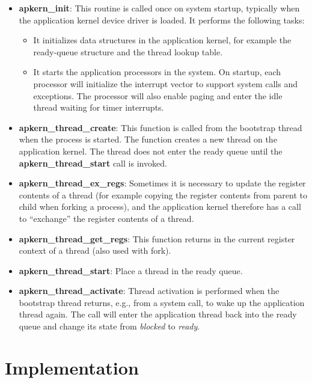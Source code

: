 \begin{itemize}
\item \textbf{apkern\_init}: This routine is called once on system startup,
  typically when the application kernel device driver is loaded. It performs
  the following tasks:
  \begin{itemize}
  \item It initializes data structures in the application kernel, for example the
    ready-queue structure and the thread lookup table.
  \item It starts the application processors in the system. On startup, each
    processor will initialize the interrupt vector to support system calls and
    exceptions. The processor will also enable paging and enter the idle
    thread waiting for timer interrupts.
  \end{itemize}
\item \textbf{apkern\_thread\_create}: This function is called from the
  bootstrap thread when the process is started. The function creates a new
  thread on the application kernel. The thread does not enter the ready queue
  until the \textbf{apkern\_thread\_start} call is invoked.

\item \textbf{apkern\_thread\_ex\_regs}: Sometimes it is necessary to update
  the register contents of a thread (for example copying the register contents
  from parent to child when forking a process), and the application kernel
  therefore has a call to ``exchange'' the register contents of a thread.

\item \textbf{apkern\_thread\_get\_regs}: This function returns in the current
  register context of a thread (also used with fork).

\item \textbf{apkern\_thread\_start}: Place a thread in the ready queue.

\item \textbf{apkern\_thread\_activate}: Thread activation is performed when
  the bootstrap thread returns, e.g., from a system call, to wake up the
  application thread again. The call will enter the application thread back
  into the ready queue and change its state from \emph{blocked} to
  \emph{ready}.
\end{itemize}



\section{Implementation}

